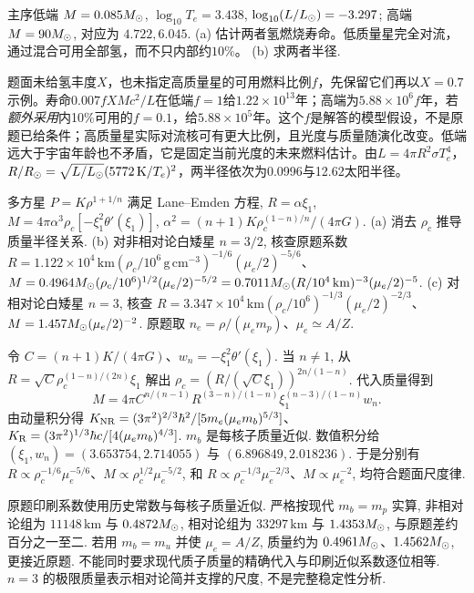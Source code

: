 \begin{exercise}
主序低端 $M=0.085M_{\odot}$, $\log_{10}T_e=3.438$, $\log_{10}(L/L_{\odot})=-3.297$; 高端 $M=90M_{\odot}$, 对应为 $4.722,6.045$.
(a) 估计两者氢燃烧寿命。低质量星完全对流，通过混合可用全部氢，而不只内部约$10\%$。
(b) 求两者半径.
\end{exercise}
\begin{solution}
题面未给氢丰度$X$，也未指定高质量星的可用燃料比例$f$，先保留它们再以$X=0.7$示例。寿命$0.007fXM c^2/L$在低端$f=1$给$1.22\times10^{13}$年；高端为$5.88\times10^6f$年，若\emph{额外采用}内10\%可用的$f=0.1$，给$5.88\times10^5$年。这个$f$是解答的模型假设，不是原题已给条件；高质量星实际对流核可有更大比例，且光度与质量随演化改变。低端远大于宇宙年龄也不矛盾，它是固定当前光度的未来燃料估计。由$L=4\pi R^2\sigma T_e^4$，$R/R_{\odot}=\sqrt{L/L_{\odot}}(5772\,\mathrm K/T_e)^2$，两半径依次为0.0996与12.62太阳半径。
\end{solution}

\begin{exercise}
多方星 $P=K\rho^{1+1/n}$ 满足 Lane--Emden 方程, $R=\alpha\xi_1$, $M=4\pi\alpha^3\rho_c[-\xi_1^2\theta'(\xi_1)]$, $\alpha^2=(n+1)K\rho_c^{(1-n)/n}/(4\pi G)$.
(a) 消去 $\rho_c$ 推导质量半径关系.
(b) 对非相对论白矮星 $n=3/2$, 核查原题系数 $R=1.122\times10^4\,\mathrm{km}(\rho_c/10^6\,\mathrm{g\,cm^{-3}})^{-1/6}(\mu_e/2)^{-5/6}$、$M=0.4964M_{\odot}(\rho_c/10^6)^{1/2}(\mu_e/2)^{-5/2}=0.7011M_{\odot}(R/10^4\,\mathrm{km})^{-3}(\mu_e/2)^{-5}$.
(c) 对相对论白矮星 $n=3$, 核查 $R=3.347\times10^4\,\mathrm{km}(\rho_c/10^6)^{-1/3}(\mu_e/2)^{-2/3}$、$M=1.457M_{\odot}(\mu_e/2)^{-2}$. 原题取 $n_e=\rho/(\mu_em_p)$、$\mu_e\simeq A/Z$.
\end{exercise}
\begin{solution}
令 $C=(n+1)K/(4\pi G)$、$w_n=-\xi_1^2\theta'(\xi_1)$. 当 $n\ne1$, 从 $R=\sqrt C\rho_c^{(1-n)/(2n)}\xi_1$ 解出 $\rho_c=(R/(\sqrt C\xi_1))^{2n/(1-n)}$. 代入质量得到
\[
M=4\pi C^{n/(n-1)}R^{(3-n)/(1-n)}\xi_1^{(n-3)/(1-n)}w_n.
\]
由动量积分得 $K_{\rm NR}=(3\pi^2)^{2/3}\hbar^2/[5m_e(\mu_em_b)^{5/3}]$、$K_{\rm R}=(3\pi^2)^{1/3}\hbar c/[4(\mu_em_b)^{4/3}]$. $m_b$ 是每核子质量近似. 数值积分给 $(\xi_1,w_n)=(3.653754,2.714055)$ 与 $(6.896849,2.018236)$. 于是分别有 $R\propto\rho_c^{-1/6}\mu_e^{-5/6}$、$M\propto\rho_c^{1/2}\mu_e^{-5/2}$, 和 $R\propto\rho_c^{-1/3}\mu_e^{-2/3}$、$M\propto\mu_e^{-2}$, 均符合题面尺度律.

原题印刷系数使用历史常数与每核子质量近似. 严格按现代 $m_b=m_p$ 实算, 非相对论组为 $11148\,\mathrm{km}$ 与 $0.4872M_{\odot}$, 相对论组为 $33297\,\mathrm{km}$ 与 $1.4353M_{\odot}$, 与原题差约百分之一至二. 若用 $m_b=m_u$ 并使 $\mu_e=A/Z$, 质量约为 $0.4961M_{\odot}$、$1.4562M_{\odot}$, 更接近原题. 不能同时要求现代质子质量的精确代入与印刷近似系数逐位相等. $n=3$ 的极限质量表示相对论简并支撑的尺度, 不是完整稳定性分析.
\end{solution}

